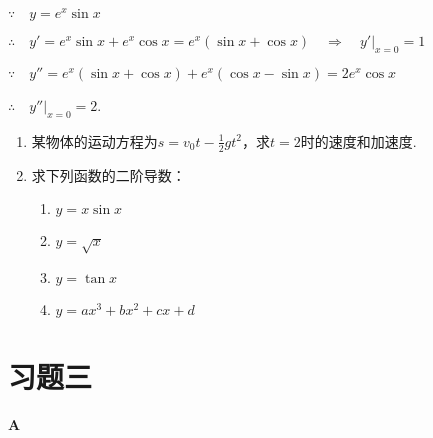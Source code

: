 \begin{solution}
$\because\quad     y=e^x\sin x$

$\therefore\quad y'=e^x\sin x+e^x\cos x=e^x(\sin x+\cos x)\quad \Rightarrow\quad y'\big|_{x=0}=1$

$\because\quad y''=e^x(\sin x+\cos x)+e^x(\cos x-\sin x)=2e^x\cos x$

$\therefore\quad y''\big|_{x=0}=2$.
\end{solution}

\begin{ex}
\begin{enumerate}
    \item 某物体的运动方程为$s=v_0t-\frac{1}{2}gt^2$，求$t=2$时的速度和加速度.
    \item  求下列函数的二阶导数：
\begin{multicols}{2}
\begin{enumerate}[(1)]
 \item  $y=x\sin x$
\item  $y=\sqrt{x}$
\item  $y=\tan x$
\item  $y=ax^3+bx^2+cx+d$ 
\end{enumerate}
\end{multicols}
\end{enumerate}
\end{ex}

\section*{习题三}
\begin{center}
    \bfseries A
\end{center}


